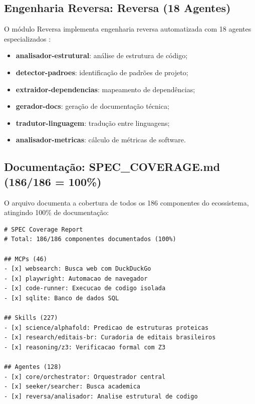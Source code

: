 \subsection{Engenharia Reversa: Reversa (18 Agentes)}
\label{subsec:reversa}

O módulo Reversa implementa engenharia reversa automatizada com 18
agentes especializados \cite{fowler2019refactoring}:

\begin{itemize}
\item \textbf{analisador-estrutural}: análise de estrutura de código;
\item \textbf{detector-padroes}: identificação de padrões de projeto;
\item \textbf{extraidor-dependencias}: mapeamento de dependências;
\item \textbf{gerador-docs}: geração de documentação técnica;
\item \textbf{tradutor-linguagem}: tradução entre linguagens;
\item \textbf{analisador-metricas}: cálculo de métricas de software.
\end{itemize}

\subsection{Documentação: SPEC\_COVERAGE.md (186/186 = 100\%)}
\label{subsec:spec-coverage}

O arquivo  documenta a cobertura de todos
os 186 componentes do ecossistema, atingindo 100\% de documentação:

\begin{lstlisting}[style=pythonstyle, caption={Cobertura de documentacao},
                   label={lst:spec-coverage}]
# SPEC Coverage Report
# Total: 186/186 componentes documentados (100%)

## MCPs (46)
- [x] websearch: Busca web com DuckDuckGo
- [x] playwright: Automacao de navegador
- [x] code-runner: Execucao de codigo isolada
- [x] sqlite: Banco de dados SQL

## Skills (227)
- [x] science/alphafold: Predicao de estruturas proteicas
- [x] research/editais-br: Curadoria de editais brasileiros
- [x] reasoning/z3: Verificacao formal com Z3

## Agentes (128)
- [x] core/orchestrator: Orquestrador central
- [x] seeker/searcher: Busca academica
- [x] reversa/analisador: Analise estrutural de codigo
\end{lstlisting}

